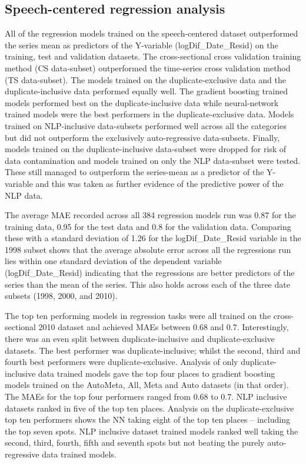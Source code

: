 \documentclass[11pt,preprint, authoryear]{elsarticle}
\numberwithin{equation}{section}
\numberwithin{figure}{section}
\numberwithin{table}{section}
\begin{document}
\hypertarget{speech-centered-regression-analysis}{%
\subsection{Speech-centered regression
analysis}\label{speech-centered-regression-analysis}}

All of the regression models trained on the speech-centered dataset
outperformed the series mean as predictors of the Y-variable
(logDif\_Date\_Resid) on the training, test and validation datasets. The
cross-sectional cross validation training method (CS data-subset)
outperformed the time-series cross validation method (TS data-subset).
The models trained on the duplicate-exclusive data and the
duplicate-inclusive data performed equally well. The gradient boosting
trained models performed best on the duplicate-inclusive data while
neural-network trained models were the best performers in the
duplicate-exclusive data. Models trained on NLP-inclusive data-subsets
performed well across all the categories but did not outperform the
exclusively auto-regressive data-subsets. Finally, models trained on the
duplicate-inclusive data-subset were dropped for risk of data
contamination and models trained on only the NLP data-subset were
tested. These still managed to outperform the series-mean as a predictor
of the Y-variable and this was taken as further evidence of the
predictive power of the NLP data.

The average MAE recorded across all 384 regression models run was 0.87
for the training data, 0.95 for the test data and 0.8 for the validation
data. Comparing these with a standard deviation of 1.26 for the
logDif\_Date\_Resid variable in the 1998 subset shows that the average
absolute error across all the regressions run lies within one standard
deviation of the dependent variable (logDif\_Date\_Resid) indicating
that the regressions are better predictors of the series than the mean
of the series. This also holds across each of the three date subsets
(1998, 2000, and 2010).

The top ten performing models in regression tasks were all trained on
the cross-sectional 2010 dataset and achieved MAEs between 0.68 and 0.7.
Interestingly, there was an even split between duplicate-inclusive and
duplicate-exclusive datasets. The best performer was
duplicate-inclusive; whilst the second, third and fourth best performers
were duplicate-exclusive. Analysis of only duplicate-inclusive data
trained models gave the top four places to gradient boosting models
trained on the AutoMeta, All, Meta and Auto datasets (in that order).
The MAEs for the top four performers ranged from 0.68 to 0.7. NLP
inclusive datasets ranked in five of the top ten places. Analysis on the
duplicate-exclusive top ten performers shows the NN taking eight of the
top ten places -- including the top seven spots. NLP inclusive dataset
trained models ranked well taking the second, third, fourth, fifth and
seventh spots but not beating the purely auto-regressive data trained
models.
\end{document}
